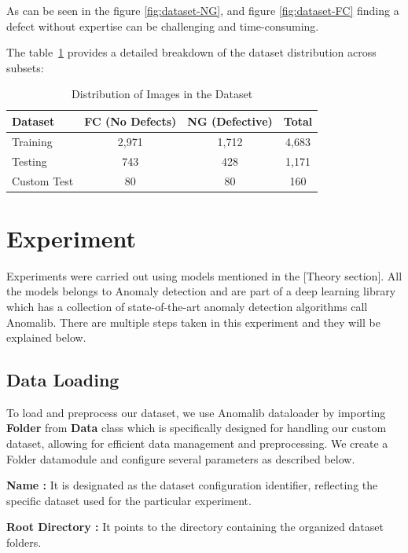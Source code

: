 As can be seen in the figure \ref{fig:dataset-NG}, and figure \ref{fig:dataset-FC} finding a defect without expertise can be challenging and time-consuming.

The table~\ref{tab:dataset-distribution} provides a detailed breakdown of the dataset distribution across subsets:

\begin{table}[ht!]
    \centering
    \begin{tabular}{|l|c|c|c|}
        \hline
        \textbf{Dataset} & \textbf{FC (No Defects)} & \textbf{NG (Defective)} & \textbf{Total} \\
        \hline
        Training & 2,971 & 1,712 & 4,683 \\
        \hline
        Testing & 743 & 428 & 1,171 \\
        \hline
        Custom Test & 80 & 80 & 160 \\
        \hline
    \end{tabular}
    \caption{Distribution of Images in the Dataset}
    \label{tab:dataset-distribution}
\end{table}

\section{Experiment}

Experiments were carried out using models mentioned in the [Theory section]. All the models belongs to Anomaly detection and are part of a deep learning library which has a collection of state-of-the-art anomaly detection algorithms call Anomalib. There are multiple steps taken in this experiment and they will be explained below.

\subsection{Data Loading}

To load and preprocess our dataset, we use Anomalib dataloader by importing \textbf{Folder} from \textbf{Data} class which is specifically designed for handling our custom dataset, allowing for efficient data management and preprocessing. We create a Folder datamodule and configure several parameters as described below.

\textbf{Name :} It is designated as the dataset configuration identifier, reflecting the specific dataset used for the particular experiment.

\textbf{Root Directory :} It points to the directory containing the organized dataset folders.

